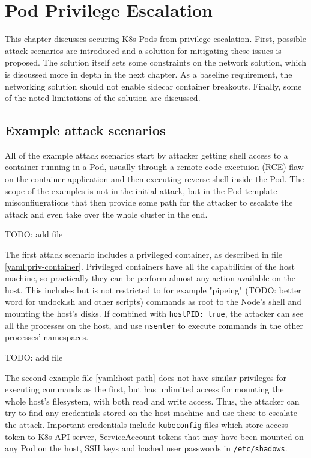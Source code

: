 \documentclass[english, 12pt, a4paper, sci, utf8, a-2b, online]{aaltothesis}
\begin{document}
\clearpage

\section{Pod Privilege Escalation}

This chapter discusses securing K8s Pods from privilege escalation. First, possible attack scenarios are introduced and a solution for mitigating these issues is proposed. The solution itself sets some constraints on the network solution, which is discussed more in depth in the next chapter. As a baseline requirement, the networking solution should not enable sidecar container breakouts. Finally, some of the noted limitations of the solution are discussed.

\subsection{Example attack scenarios}

All of the example attack scenarios start by attacker getting shell access to a container running in a Pod, usually through a remote code exectuion (RCE) flaw on the container application and then executing reverse shell inside the Pod. The scope of the examples is not in the initial attack, but in the Pod template misconfiugrations that then provide some path for the attacker to escalate the attack and even take over the whole cluster in the end.

TODO: add file \label{yaml:priv-container}

The first attack scenario includes a privileged container, as described in file \ref{yaml:priv-container}. Privileged containers have all the capabilities of the host machine, so practically they can be perform almost any action available on the host. This includes but is not restricted to for example "pipeing" (TODO: better word for undock.sh and other scripts) commands as root to the Node's shell and mounting the host's disks. If combined with \texttt{hostPID:\ true}, the attacker can see all the processes on the host, and use \texttt{nsenter} to execute commands in the other processes' namespaces.

TODO: add file \label{yaml:host-path}

The second example file \ref{yaml:host-path} does not have similar privileges for executing commands as the first, but has unlimited access for mounting the whole host's filesystem, with both read and write access. Thus, the attacker can try to find any credentials stored on the host machine and use these to escalate the attack. Important credentials include \texttt{kubeconfig} files which store access token to K8s API server, ServiceAccount tokens that may have been mounted on any Pod on the host, SSH keys and hashed user passwords in \texttt{/etc/shadows}.
\end{document}
